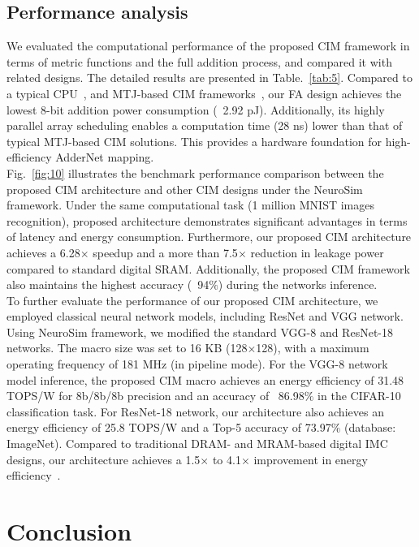 \documentclass[submit]{elex2024}%
\begin{document}
\subsection{Performance analysis}

We evaluated the computational performance of the proposed CIM framework in terms of metric functions and the full addition process, and compared it with related designs. The detailed results are presented in Table.~\ref{tab:5}. Compared to a typical CPU~\cite{29}, and MTJ-based CIM frameworks~\cite{35,36,37}, our FA design achieves the lowest 8-bit addition power consumption (~2.92 pJ). Additionally, its highly parallel array scheduling enables a computation time (28 ns) lower than that of typical MTJ-based CIM solutions. This provides a hardware foundation for high-efficiency AdderNet mapping.\\
Fig.~\ref{fig:10} illustrates the benchmark performance comparison between the proposed CIM architecture and other CIM designs under the NeuroSim framework. Under the same computational task (1 million MNIST images recognition), proposed architecture demonstrates significant advantages in terms of latency and energy consumption. Furthermore, our proposed CIM architecture achieves a 6.28$\times$ speedup and a more than 7.5$\times$ reduction in leakage power compared to standard digital SRAM. Additionally, the proposed CIM framework also maintains the highest accuracy (~94$\%$) during the networks inference.\\
To further evaluate the performance of our proposed CIM architecture, we employed classical neural network models, including ResNet and VGG network. Using NeuroSim framework, we modified the standard VGG-8 and ResNet-18 networks. The macro size was set to 16 KB (128$\times$128), with a maximum operating frequency of 181 MHz (in pipeline mode). For the VGG-8 network model inference, the proposed CIM macro achieves an energy efficiency of 31.48 TOPS/W for 8b/8b/8b precision and an accuracy of ~86.98$\%$ in the CIFAR-10 classification task. For ResNet-18 network, our architecture also achieves an energy efficiency of 25.8 TOPS/W and a Top-5 accuracy of 73.97$\%$ (database: ImageNet). Compared to traditional DRAM- and MRAM-based digital IMC designs, our architecture achieves a 1.5$\times$ to 4.1$\times$ improvement in energy efficiency~\cite{38,39}.

\section{Conclusion}
\end{document}
